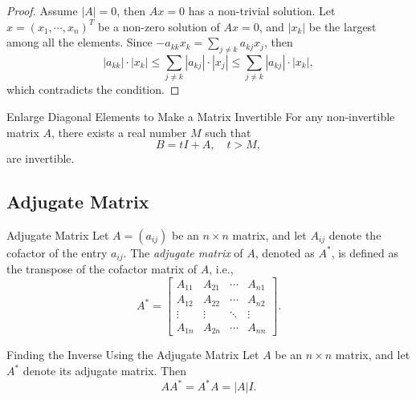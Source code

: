 \begin{proof}
  Assume $|A| = 0$, then $Ax = 0$ has a non-trivial solution.
  Let $x = (x_1,\cdots,x_n)^T$ be a non-zero solution of $Ax = 0$,
  and $|x_k|$ be the largest among all the elements.
  Since $-a_{kk}x_k = \sum _{j \neq k}a_{kj}x_j$, then
  \begin{equation}
    |a_{kk}| \cdot |x_k| \leq \sum_{j \neq k} |a_{kj}| \cdot |x_j|
    \leq \sum _{j \neq k} |a_{kj}| \cdot |x_k|,
  \end{equation}
  which contradicts the condition.
\end{proof}

\begin{corollary}{Enlarge Diagonal Elements to Make a Matrix Invertible}{}
  For any non-invertible matrix $A$, there exists a real number $M$ such that
  \begin{equation}
    B = tI + A, \quad t > M,
  \end{equation}
  are invertible.
\end{corollary}

\subsection{Adjugate Matrix}


\begin{definition}{Adjugate Matrix}{}
  Let $A = (a_{ij})$ be an $n \times n$ matrix, and let $A_{ij}$ denote
  the cofactor of the entry $a_{ij}$.
  The \emph{adjugate matrix} of $A$, denoted as $A^{\ast}$,
  is defined as the transpose of the cofactor matrix of $A$, i.e.,
  \begin{equation}
    A^*=\begin{bmatrix}A_{11}&A_{21}&\cdots&A_{n1}\\A_{12}&A_{22}&\cdots&A_{n2}\\\vdots&\vdots&\ddots&\vdots\\A_{1n}&A_{2n}&\cdots&A_{nn}\end{bmatrix}.
  \end{equation}
\end{definition}

\begin{proposition}{Finding the Inverse Using the Adjugate Matrix}{}
  Let $A$ be an $n \times n$ matrix, and let $A^{\ast}$ denote its adjugate matrix.
  Then
  \begin{equation}
    AA^{\ast} = A^{\ast}A = |A| I.
  \end{equation}
\end{proposition}

